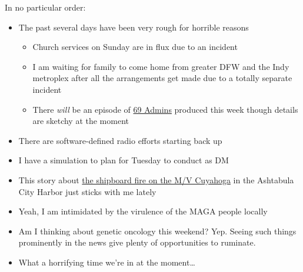 In no particular order:

\begin{itemize}
\tightlist
\item
  The past several days have been very rough for horrible reasons

  \begin{itemize}
  \tightlist
  \item
    Church services on Sunday are in flux due to an incident
  \item
    I am waiting for family to come home from greater DFW and the Indy
    metroplex after all the arrangements get made due to a totally
    separate incident
  \item
    There \emph{will} be an episode of \href{https://69admins.com/}{69
    Admins} produced this week though details are sketchy at the moment
  \end{itemize}
\item
  There are software-defined radio efforts starting back up
\item
  I have a simulation to plan for Tuesday to conduct as DM
\item
  This story about
  \href{https://www.cbc.ca/news/canada/windsor/cuyahoga-ship-fire-1.7145431}{the
  shipboard fire on the M/V Cuyahoga} in the Ashtabula City Harbor just
  sticks with me lately
\item
  Yeah, I am intimidated by the virulence of the MAGA people locally
\item
  Am I thinking about genetic oncology this weekend? Yep. Seeing such
  things prominently in the news give plenty of opportunities to
  ruminate.
\item
  What a horrifying time we're in at the moment\ldots{}
\end{itemize}
